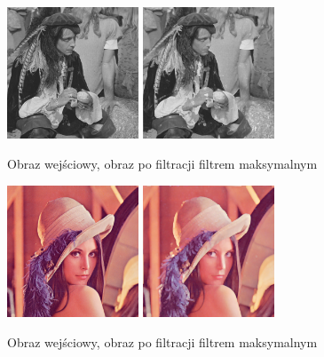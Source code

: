 \documentclass[final,a4paper,openany,12pt]{mwbk}
\begin{document}
\begin{figure}[H]
	\begin{center}
		\includegraphics[width=0.35\textwidth]{pirate_gray}
		\includegraphics[width=0.35\textwidth]{pirate_gray_max_result}
	\end{center}
	\caption{Obraz wejściowy, obraz po filtracji filtrem maksymalnym}
\end{figure}

\begin{figure}[H]
	\begin{center}
		\includegraphics[width=0.35\textwidth]{lena_color}
		\includegraphics[width=0.35\textwidth]{lena_color_max_result}
	\end{center}
	\caption{Obraz wejściowy, obraz po filtracji filtrem maksymalnym}
\end{figure}
\end{document}
